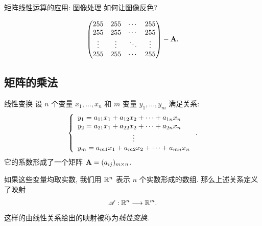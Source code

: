 \begin{frame}{矩阵线性运算的应用: 图像处理}
	\onslide<+->
	如何让图像反色?
	\begin{center}
	\end{center}
	
	\onslide<+->
	\[\begin{pmatrix}
		255&255&\cdots&255\\
		255&255&\cdots&255\\
		\vdots&\vdots&\ddots&\vdots\\
		255&255&\cdots&255
	\end{pmatrix}-{\mathbf{A}}.\]
\end{frame}

\subsection{矩阵的乘法}

\begin{frame}{线性变换}
	\onslide<+->
	设 $n$ 个变量 $x_1,\dots,x_n$ 和 $m$ 变量 $y_1,\dots,y_m$ 满足关系:
	\[\laeq{
		y_1=a_{11}x_1+a_{12}x_2+\cdots+a_{1n}x_n\\
		y_2=a_{21}x_1+a_{22}x_2+\cdots+a_{2n}x_n\\
		\vvdots\\
		y_m=a_{m1}x_1+a_{m2}x_2+\cdots+a_{mn}x_n
	}.\]
	\onslide<+->
	它的系数形成了一个矩阵 ${\mathbf{A}}=(a_{ij})_{m\times n}$.

	\onslide<+->
	如果这些变量均取实数, 我们用 ${\mathbb{R}}^n$ 表示 $n$ 个实数形成的数组.
	\onslide<+->
	那么上述关系定义了映射
	\[\mathscr{A}: {\mathbb{R}}^n\longrightarrow {\mathbb{R}}^m.\]
	\onslide<+->
	这样的由线性关系给出的映射被称为\emph{线性变换}.
\end{frame}


